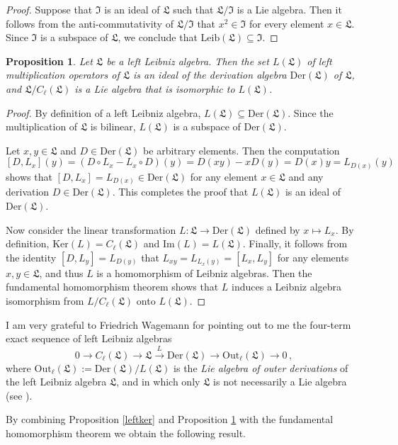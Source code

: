 \documentclass{amsart}
\newtheorem{pro}[thm]{Proposition}
\numberwithin{equation}{section}
\newcommand{\der}{\mathrm{Der}}
\newcommand{\out}{\mathrm{Out}}
\newcommand{\leib}{\mathrm{Leib}}
\newcommand{\Ker}{\mathrm{Ker}}
\newcommand{\im}{\mathrm{Im}}
\newcommand{\lf}{\mathfrak{L}}
\newcommand{\If}{\mathfrak{I}}
\begin{document}
\begin{proof}
Suppose that $\If$ is an ideal of $\lf$ such that $\lf/\If$ is a Lie algebra. Then it follows from
the anti-commutativity of $\lf/\If$ that $x^2\in\If$ for every element $x\in\lf$. Since $\If$ is a
subspace of $\lf$, we conclude that $\leib(\lf)\subseteq\If$.
\end{proof}

\begin{pro}\label{leftmult}
Let $\lf$ be a left Leibniz algebra. Then the set $L(\lf)$ of left multiplication operators of $\lf$ is
an ideal of the derivation algebra $\der(\lf)$ of $\lf$, and $\lf/C_\ell(\lf)$ is a Lie algebra that is
isomorphic to $L(\lf)$.
\end{pro}

\begin{proof}
By definition of a left Leibniz algebra, $L(\lf)\subseteq\der(\lf)$. Since the multiplication of $\lf$ is
bilinear, $L(\lf)$ is a subspace of $\der(\lf)$.

Let $x,y\in\lf$ and $D\in\der(\lf)$ be arbitrary elements. Then the computation $$[D,L_x](y)=(D
\circ L_x-L_x\circ D)(y)=D(xy)-xD(y)=D(x)y=L_{D(x)}(y)$$ shows that $[D,L_x]=L_{D(x)}\in\der
(\lf)$ for any element $x\in\lf$ and any derivation $D\in\der(\lf)$. This completes the proof that
$L(\lf)$ is an ideal of $\der(\lf)$.

Now consider the linear transformation $L:\lf\to\der(\lf)$ defined by $x\mapsto L_x$. By definition,
$\Ker(L)=C_\ell(\lf)$ and $\im(L)=L(\lf)$. Finally, it follows from the identity $[D,L_y]=L_{D(y)}$
that $L_{xy}=L_{L_x(y)}=[L_x,L_y]$ for any elements $x,y\in\lf$, and thus $L$ is a homomorphism
of Leibniz algebras. Then the fundamental homomorphism theorem shows that $L$ induces a Leibniz
algebra isomorphism from $L/C_\ell(\lf)$ onto $L(\lf)$.
\end{proof}

 I am very grateful to Friedrich Wagemann for pointing out to me the four-term
exact sequence of left Leibniz algebras $$0\to C_\ell(\lf)\to\lf\stackrel{L}\to\der(\lf)\to\out_\ell(\lf)\to
0\,,$$ where $\out_\ell(\lf):=\der(\lf)/L(\lf)$ is the {\em Lie algebra of outer derivations\/} of the left
Leibniz algebra $\lf$, and in which only $\lf$ is not necessarily a Lie algebra (see \cite[Proposition 1.8]{DW}).
\vspace{.3cm}

By combining Proposition \ref{leftker} and Proposition \ref{leftmult} with the fundamental homomorphism
theorem we obtain the following result.
\end{document}

